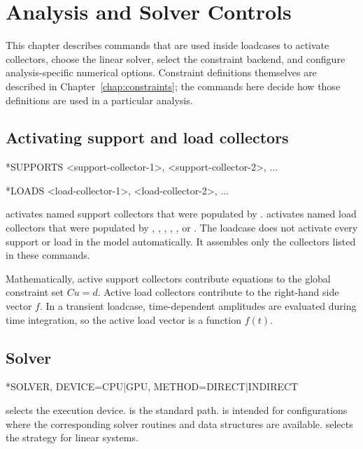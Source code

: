 \chapter{Analysis and Solver Controls}
\label{chap:analysis-controls}

This chapter describes commands that are used inside loadcases to activate collectors, choose the linear solver, select the constraint backend, and configure analysis-specific numerical options. Constraint definitions themselves are described in Chapter~\ref{chap:constraints}; the commands here decide how those definitions are used in a particular analysis.

\section{Activating support and load collectors}

\begin{syntax}
*SUPPORTS
<support-collector-1>, <support-collector-2>, ...

*LOADS
<load-collector-1>, <load-collector-2>, ...
\end{syntax}

 activates named support collectors that were populated by .  activates named load collectors that were populated by , , , , , or . The loadcase does not activate every support or load in the model automatically. It assembles only the collectors listed in these commands.

Mathematically, active support collectors contribute equations to the global constraint set \(C u=d\). Active load collectors contribute to the right-hand side vector \(f\). In a transient loadcase, time-dependent amplitudes are evaluated during time integration, so the active load vector is a function \(f(t)\).

\section{Solver}

\begin{syntax}
*SOLVER, DEVICE=CPU|GPU, METHOD=DIRECT|INDIRECT
\end{syntax}

 selects the execution device.  is the standard path.  is intended for configurations where the corresponding solver routines and data structures are available.  selects the strategy for linear systems.

